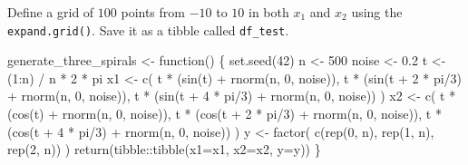 \documentclass[
  letterpaper,
  DIV=11,
  numbers=noendperiod]{scrartcl}
\newenvironment{Shaded}{\begin{snugshade}}{\end{snugshade}}
\newcommand{\AttributeTok}[1]{\textcolor[rgb]{0.40,0.45,0.13}{#1}}
\newcommand{\ControlFlowTok}[1]{\textcolor[rgb]{0.00,0.23,0.31}{#1}}
\newcommand{\DecValTok}[1]{\textcolor[rgb]{0.68,0.00,0.00}{#1}}
\newcommand{\FloatTok}[1]{\textcolor[rgb]{0.68,0.00,0.00}{#1}}
\newcommand{\FunctionTok}[1]{\textcolor[rgb]{0.28,0.35,0.67}{#1}}
\newcommand{\NormalTok}[1]{\textcolor[rgb]{0.00,0.23,0.31}{#1}}
\newcommand{\OtherTok}[1]{\textcolor[rgb]{0.00,0.23,0.31}{#1}}
\newcommand{\SpecialCharTok}[1]{\textcolor[rgb]{0.37,0.37,0.37}{#1}}
\begin{document}
Define a grid of \(100\) points from \(-10\) to \(10\) in both \(x_1\)
and \(x_2\) using the \texttt{expand.grid()}. Save it as a tibble called
\texttt{df\_test}.

\begin{Shaded}
\begin{Highlighting}[]
\NormalTok{generate\_three\_spirals }\OtherTok{\textless{}{-}} \ControlFlowTok{function}\NormalTok{() \{}
  \FunctionTok{set.seed}\NormalTok{(}\DecValTok{42}\NormalTok{)}
\NormalTok{  n }\OtherTok{\textless{}{-}} \DecValTok{500}
\NormalTok{  noise }\OtherTok{\textless{}{-}} \FloatTok{0.2}
\NormalTok{  t }\OtherTok{\textless{}{-}}\NormalTok{ (}\DecValTok{1}\SpecialCharTok{:}\NormalTok{n) }\SpecialCharTok{/}\NormalTok{ n }\SpecialCharTok{*} \DecValTok{2} \SpecialCharTok{*}\NormalTok{ pi}
\NormalTok{  x1 }\OtherTok{\textless{}{-}} \FunctionTok{c}\NormalTok{(}
\NormalTok{    t }\SpecialCharTok{*}\NormalTok{ (}\FunctionTok{sin}\NormalTok{(t) }\SpecialCharTok{+} \FunctionTok{rnorm}\NormalTok{(n, }\DecValTok{0}\NormalTok{, noise)),}
\NormalTok{    t }\SpecialCharTok{*}\NormalTok{ (}\FunctionTok{sin}\NormalTok{(t }\SpecialCharTok{+} \DecValTok{2} \SpecialCharTok{*}\NormalTok{ pi}\SpecialCharTok{/}\DecValTok{3}\NormalTok{) }\SpecialCharTok{+} \FunctionTok{rnorm}\NormalTok{(n, }\DecValTok{0}\NormalTok{, noise)),}
\NormalTok{    t }\SpecialCharTok{*}\NormalTok{ (}\FunctionTok{sin}\NormalTok{(t }\SpecialCharTok{+} \DecValTok{4} \SpecialCharTok{*}\NormalTok{ pi}\SpecialCharTok{/}\DecValTok{3}\NormalTok{) }\SpecialCharTok{+} \FunctionTok{rnorm}\NormalTok{(n, }\DecValTok{0}\NormalTok{, noise))}
\NormalTok{  )}
\NormalTok{  x2 }\OtherTok{\textless{}{-}} \FunctionTok{c}\NormalTok{(}
\NormalTok{    t }\SpecialCharTok{*}\NormalTok{ (}\FunctionTok{cos}\NormalTok{(t) }\SpecialCharTok{+} \FunctionTok{rnorm}\NormalTok{(n, }\DecValTok{0}\NormalTok{, noise)),}
\NormalTok{    t }\SpecialCharTok{*}\NormalTok{ (}\FunctionTok{cos}\NormalTok{(t }\SpecialCharTok{+} \DecValTok{2} \SpecialCharTok{*}\NormalTok{ pi}\SpecialCharTok{/}\DecValTok{3}\NormalTok{) }\SpecialCharTok{+} \FunctionTok{rnorm}\NormalTok{(n, }\DecValTok{0}\NormalTok{, noise)),}
\NormalTok{    t }\SpecialCharTok{*}\NormalTok{ (}\FunctionTok{cos}\NormalTok{(t }\SpecialCharTok{+} \DecValTok{4} \SpecialCharTok{*}\NormalTok{ pi}\SpecialCharTok{/}\DecValTok{3}\NormalTok{) }\SpecialCharTok{+} \FunctionTok{rnorm}\NormalTok{(n, }\DecValTok{0}\NormalTok{, noise))}
\NormalTok{  )}
\NormalTok{  y }\OtherTok{\textless{}{-}} \FunctionTok{factor}\NormalTok{(}
    \FunctionTok{c}\NormalTok{(}\FunctionTok{rep}\NormalTok{(}\DecValTok{0}\NormalTok{, n), }\FunctionTok{rep}\NormalTok{(}\DecValTok{1}\NormalTok{, n), }\FunctionTok{rep}\NormalTok{(}\DecValTok{2}\NormalTok{, n))}
\NormalTok{  )}
  \FunctionTok{return}\NormalTok{(tibble}\SpecialCharTok{::}\FunctionTok{tibble}\NormalTok{(}\AttributeTok{x1=}\NormalTok{x1, }\AttributeTok{x2=}\NormalTok{x2, }\AttributeTok{y=}\NormalTok{y))}
\NormalTok{\}}


\end{Highlighting}
\end{Shaded}
\end{document}
